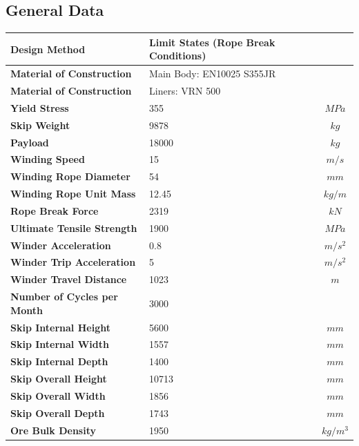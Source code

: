 \documentclass{article}%
\begin{document}
%
\subsection{General Data}%
\label{subsec:GeneralData}%
\begin{flushleft}%
\begin{minipage}{\textwidth}%
\flushleft%
\begin{tabular}{|l |l |c|}%
\hline%
\textbf{Design Method}&Limit States (Rope Break Conditions)&\\%
\hline%
\textbf{Material of Construction}&Main Body: EN10025 S355JR&\\%
\hline%
\textbf{Material of Construction}&Liners: VRN 500&\\%
\hline%
\textbf{Yield Stress}&355&$MPa$\\%
\hline%
\textbf{Skip Weight}&9878&$kg$\\%
\hline%
\textbf{Payload}&18000&$kg$\\%
\hline%
\textbf{Winding Speed}&15&$m/s$\\%
\hline%
\textbf{Winding Rope Diameter}&54&$mm$\\%
\hline%
\textbf{Winding Rope Unit Mass}&12.45&$kg/m$\\%
\hline%
\textbf{Rope Break Force}&2319&$kN$\\%
\hline%
\textbf{Ultimate Tensile Strength}&1900&$MPa$\\%
\hline%
\textbf{Winder Acceleration}&0.8&$m/s^2$\\%
\hline%
\textbf{Winder Trip Acceleration}&5&$m/s^2$\\%
\hline%
\textbf{Winder Travel Distance}&1023&$m$\\%
\hline%
\textbf{Number of Cycles per Month}&3000&\\%
\hline%
\textbf{Skip Internal Height}&5600&$mm$\\%
\hline%
\textbf{Skip Internal Width}&1557&$mm$\\%
\hline%
\textbf{Skip Internal Depth}&1400&$mm$\\%
\hline%
\textbf{Skip Overall Height}&10713&$mm$\\%
\hline%
\textbf{Skip Overall Width}&1856&$mm$\\%
\hline%
\textbf{Skip Overall Depth}&1743&$mm$\\%
\hline%
\textbf{Ore Bulk Density}&1950&$kg/m^3$\\%
\hline%
\end{tabular}%
\end{minipage}%
\end{flushleft}
\end{document}
